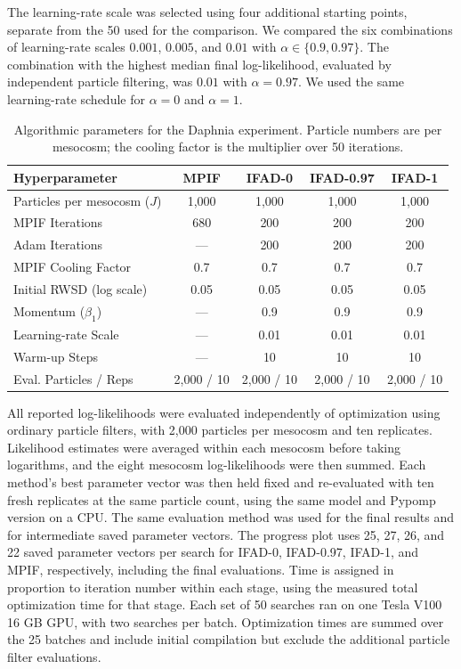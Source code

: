 \documentclass[11pt]{article}
\theoremstyle{thmstylethree}%
\begin{document}
The learning-rate scale was selected using four additional starting points, separate from the 50 used for the comparison.
We compared the six combinations of learning-rate scales $0.001$, $0.005$, and $0.01$ with $\alpha\in\{0.9,0.97\}$.
The combination with the highest median final log-likelihood, evaluated by independent particle filtering, was $0.01$ with $\alpha=0.97$.
We used the same learning-rate schedule for $\alpha=0$ and $\alpha=1$.

\begin{table}[htbp!]
\centering
\begin{tabular}{p{4.5cm}cccc}
\toprule
\textbf{Hyperparameter} & \textbf{MPIF} & \textbf{IFAD-0} & \textbf{IFAD-0.97} & \textbf{IFAD-1} \\
\midrule
Particles per mesocosm ($J$) & 1,000 & 1,000 & 1,000 & 1,000 \\
MPIF Iterations & 680 & 200 & 200 & 200 \\
Adam Iterations & --- & 200 & 200 & 200 \\
MPIF Cooling Factor & 0.7 & 0.7 & 0.7 & 0.7 \\
Initial RWSD (log scale) & 0.05 & 0.05 & 0.05 & 0.05 \\
Momentum ($\beta_1$) & --- & 0.9 & 0.9 & 0.9 \\
Learning-rate Scale & --- & 0.01 & 0.01 & 0.01 \\
Warm-up Steps & --- & 10 & 10 & 10 \\
Eval. Particles / Reps & 2,000 / 10 & 2,000 / 10 & 2,000 / 10 & 2,000 / 10 \\
\bottomrule
\end{tabular}
\caption{Algorithmic parameters for the Daphnia experiment. Particle numbers are per mesocosm; the cooling factor is the multiplier over 50 iterations.}
\label{tab:daphnia-settings}
\end{table}

All reported log-likelihoods were evaluated independently of optimization using ordinary particle filters, with 2,000 particles per mesocosm and ten replicates.
Likelihood estimates were averaged within each mesocosm before taking logarithms, and the eight mesocosm log-likelihoods were then summed.
Each method's best parameter vector was then held fixed and re-evaluated with ten fresh replicates at the same particle count, using the same model and Pypomp version on a CPU.
The same evaluation method was used for the final results and for intermediate saved parameter vectors.
The progress plot uses 25, 27, 26, and 22 saved parameter vectors per search for IFAD-0, IFAD-0.97, IFAD-1, and MPIF, respectively, including the final evaluations.
Time is assigned in proportion to iteration number within each stage, using the measured total optimization time for that stage.
Each set of 50 searches ran on one Tesla V100 16 GB GPU, with two searches per batch.
Optimization times are summed over the 25 batches and include initial compilation but exclude the additional particle filter evaluations.
\end{document}

